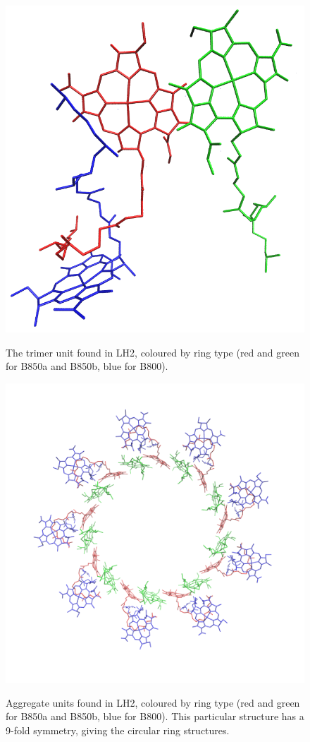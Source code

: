 \begin{figure}
	\centering 
	\includegraphics[scale=0.3]{chapters/introduction/subunit.png}
	\label{fig:LH2_subunit}
	\caption{The trimer unit found in LH2, coloured by ring type (red and green
	for B850a and B850b, blue for B800).}
\end{figure}

\begin{figure}
	\centering 
	\includegraphics[scale=0.3]{chapters/introduction/ring_assign.png}
	\label{fig:LH2_rings}
	\caption{Aggregate units found in LH2, coloured by ring type (red and green
	for B850a and B850b, blue for B800). This particular structure has a 9-fold
	symmetry, giving the circular ring structures.}
\end{figure}

